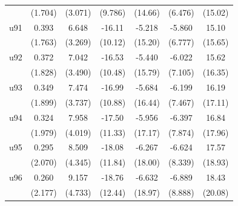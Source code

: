 \begin{table}[htbp]
\begin{tabular}{l*{6}{c}}
                    &     (1.704)         &     (3.071)         &     (9.786)         &     (14.66)         &     (6.476)         &     (15.02)         \\
\addlinespace
u91                 &       0.393         &       6.648\sym{**} &      -16.11         &      -5.218         &      -5.860         &       15.10         \\
                    &     (1.763)         &     (3.269)         &     (10.12)         &     (15.20)         &     (6.777)         &     (15.65)         \\
\addlinespace
u92                 &       0.372         &       7.042\sym{**} &      -16.53         &      -5.440         &      -6.022         &       15.62         \\
                    &     (1.828)         &     (3.490)         &     (10.48)         &     (15.79)         &     (7.105)         &     (16.35)         \\
\addlinespace
u93                 &       0.349         &       7.474\sym{**} &      -16.99         &      -5.684         &      -6.199         &       16.19         \\
                    &     (1.899)         &     (3.737)         &     (10.88)         &     (16.44)         &     (7.467)         &     (17.11)         \\
\addlinespace
u94                 &       0.324         &       7.958\sym{**} &      -17.50         &      -5.956         &      -6.397         &       16.84         \\
                    &     (1.979)         &     (4.019)         &     (11.33)         &     (17.17)         &     (7.874)         &     (17.96)         \\
\addlinespace
u95                 &       0.295         &       8.509\sym{*}  &      -18.08         &      -6.267         &      -6.624         &       17.57         \\
                    &     (2.070)         &     (4.345)         &     (11.84)         &     (18.00)         &     (8.339)         &     (18.93)         \\
\addlinespace
u96                 &       0.260         &       9.157\sym{*}  &      -18.76         &      -6.632         &      -6.889         &       18.43         \\
                    &     (2.177)         &     (4.733)         &     (12.44)         &     (18.97)         &     (8.888)         &     (20.08)         \\

\end{tabular}
\end{table}
